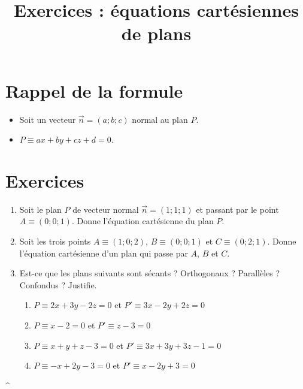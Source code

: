 

\title{Exercices : équations cartésiennes de plans}
\date{}



	\maketitle
	
	\section{Rappel de la formule}
		\begin{itemize}
			\item Soit un vecteur $\vec{n} = \left(a;b;c\right)$ normal au plan $P$.
			\item $P \equiv ax + by + cz + d = 0$.
		\end{itemize}

	\section{Exercices}
		\begin{enumerate}
			\item Soit le plan $P$ de vecteur normal $\vec{n} = \left(1; 1; 1\right)$ et passant par le point $A \equiv \left(0; 0; 1\right)$. Donne l'équation cartésienne du plan $P$.
			
			\item Soit les trois points $A \equiv \left(1; 0; 2\right)$, $B \equiv \left(0; 0; 1\right)$ et $C \equiv \left(0; 2; 1\right)$. Donne l'équation cartésienne d'un plan qui passe par $A$, $B$ et $C$.
			
			\item Est-ce que les plans suivants sont sécants ? Orthogonaux ? Parallèles ? Confondus ? Justifie.
			\begin{enumerate}
				\item $P \equiv 2x + 3y -2z = 0 $ et $P' \equiv 3x - 2y + 2z = 0$
				\item $P \equiv x - 2 = 0 $ et $P' \equiv z - 3 = 0$
				\item $P \equiv x + y + z -3 = 0 $ et $P' \equiv 3x + 3y + 3z - 1 = 0$
				\item $P \equiv -x + 2y - 3 = 0 $ et $P' \equiv x - 2y + 3 = 0$
			\end{enumerate}
		\end{enumerate}
	
^
